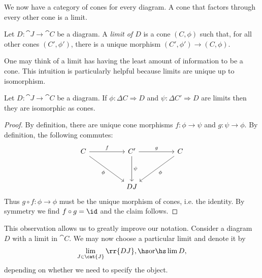 \documentclass{article}
\begin{document}
We now have a category of cones for every diagram.
A cone that factors through every other cone is a limit.

\begin{definition}
  Let $D:\cat{J}\to\cat{C}$ be a diagram. A \emph{limit of $D$} is a cone
  $(C,\phi)$ such that, for all other cones $(C',\phi')$, there is a unique morphism
  $(C',\phi')\to(C,\phi)$.
\end{definition}

One may think of a limit has having the least amount of information to be a cone.
This intuition is particularly helpful because limits are unique up to isomorphism.

\begin{proposition}\label{prop:limits_are_unique}
  Let $D:\cat{J}\to\cat{C}$ be a diagram. If $\phi:\Delta C\Rightarrow D$
  and $\psi:\Delta C'\Rightarrow D$ are limits then they are isomorphic as cones.
  \begin{proof}
    By definition, there are unique cone morphisms $f:\phi\to\psi$ and
    $g:\psi\to\phi$. By definition, the following commutes:
    \begin{equation}
      \begin{tikzcd}
        C && {C'} && C \\
        \\
          && DJ
          \arrow["f", from=1-1, to=1-3]
          \arrow["\psi", from=1-3, to=3-3]
          \arrow["\phi"', from=1-1, to=3-3]
          \arrow["\phi", from=1-5, to=3-3]
          \arrow["g", from=1-3, to=1-5]
      \end{tikzcd}
    \end{equation}
    Thus $g\circ f:\phi\to\phi$ must be the unique morphism of cones, i.e.
    the identity. By symmetry we find $f\circ g=\id$ and the claim follows.
  \end{proof}
\end{proposition}

\begin{notation}
  This observation allows us to greatly improve our notation. Consider a diagram
  $D$ with a limit in $\cat{C}$. We may now choose a particular limit and denote
  it by
  \begin{align*}
    \lim_{J\in\cat{J}}\rr{DJ},\hs\text{or}\hs\lim D,
  \end{align*}
  depending on whether we need to specify the object.
\end{notation}
\end{document}
